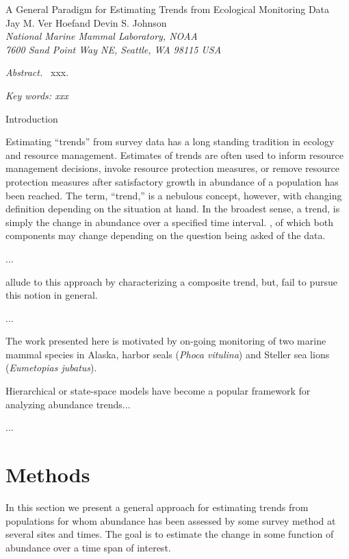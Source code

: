 \documentclass[12pt,letter]{article}
\begin{document}
\begin{center}
\Large A General Paradigm for Estimating Trends from Ecological Monitoring Data
\bigskip\\
\normalsize
{\sc Jay M. Ver Hoef\footnotemark[1] and Devin S. Johnson}\smallskip\\
{\em National Marine Mammal Laboratory, NOAA\\
7600 Sand Point Way NE, Seattle,
WA 98115 USA }\\ \medskip
\end{center}

\raggedright \setlength{\parindent}{0.3in}
\renewcommand{\baselinestretch}{1.7}\normalsize
{}
 \linenumbers

{\em Abstract.\ } xxx.

{\em Key words: xxx}

\centerline{\sc Introduction}

Estimating ``trends'' from survey data has a long standing tradition in ecology and resource management. Estimates of trends are often used to inform resource management decisions, invoke resource protection measures, or remove resource protection measures after satisfactory growth in abundance of a population has been reached. The term, ``trend,'' is a nebulous concept, however, with changing definition depending on the situation at hand. In the broadest sense, a trend, is simply the change in abundance over a specified time interval. , of which both components may change depending on the question being asked of the data.   

...


\citet{Link:2002zd} allude to this approach by characterizing a composite trend, but, fail to pursue this notion in general.


...

The work presented here is motivated by on-going monitoring of two marine mammal species in Alaska, harbor seals ({\it Phoca vitulina}) and Steller sea lions ({\it Eumetopias jubatus}).

Hierarchical or state-space models have become a popular framework for analyzing abundance trends...

...
   
\section{Methods}

In this section we present a general approach for estimating trends from populations for whom abundance has been assessed by some survey method at several sites and times. The goal is to estimate the change in some function of abundance over a time span of interest. 
\end{document}
